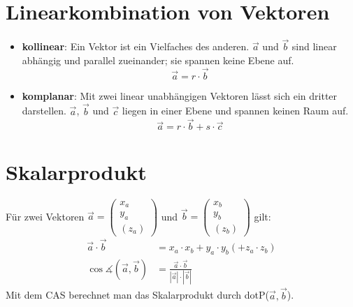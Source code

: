 \section{Linearkombination von Vektoren}
\begin{itemize}
  \item \textbf{kollinear}:
  Ein Vektor ist ein Vielfaches des anderen. $\overrightarrow{a}$
  und $\overrightarrow{b}$ sind linear abhängig und parallel
  zueinander; sie spannen keine Ebene auf.
  \begin{equation}
    \overrightarrow{a} = r \cdot \overrightarrow{b}
  \end{equation}

  \item \textbf{komplanar}:
  Mit zwei linear unabhängigen Vektoren lässt sich ein dritter
  darstellen. $\overrightarrow{a}$, $\overrightarrow{b}$ und
  $\overrightarrow{c}$ liegen in einer Ebene und spannen keinen
  Raum auf.
  \begin{equation}
    \overrightarrow{a} = r \cdot \overrightarrow{b} + s \cdot \overrightarrow{c}
  \end{equation}
\end{itemize}

\newpage
\section{Skalarprodukt}
Für zwei Vektoren
$\overrightarrow{a} = \left(\begin{array}{c} x_a \\ y_a \\ (z_a)
\end{array}\right)$ und $\overrightarrow{b} = \left(\begin{array}{c}
x_b \\ y_b \\(z_b) \end{array}\right)$ gilt:
\begin{align}
  \overrightarrow{a} \cdot \overrightarrow{b}
  &= x_a \cdot x_b + y_a \cdot y_b (+z_a \cdot z_b) \\
  \cos \measuredangle (\overrightarrow{a},\overrightarrow{b})
  &= \frac{\overrightarrow{a} \cdot \overrightarrow{b}}
  {| \overrightarrow{a} | \cdot | \overrightarrow{b} |}
\end{align}
Mit dem CAS berechnet man das Skalarprodukt durch
\glqq dotP($\overrightarrow{a}, \overrightarrow{b}$)\grqq.


